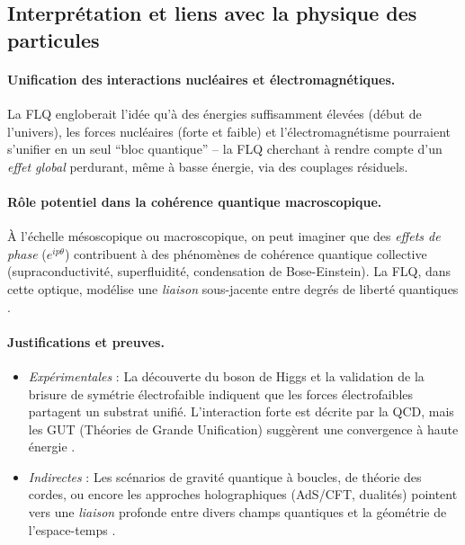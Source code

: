 \documentclass[12pt]{article}
\begin{document}
\subsection{Interprétation et liens avec la physique des particules}

\paragraph{Unification des interactions nucléaires et électromagnétiques.}
La FLQ engloberait l'idée qu'à des énergies suffisamment élevées (début de l'univers), 
les forces nucléaires (forte et faible) et l'électromagnétisme 
pourraient s'unifier \cite{georgi1974unified, langacker1981grand} 
en un seul ``bloc quantique'' – la FLQ cherchant à rendre compte d'un \emph{effet global} 
perdurant, même à basse énergie, via des couplages résiduels.

\paragraph{Rôle potentiel dans la cohérence quantique macroscopique.}
À l'échelle mésoscopique ou macroscopique, on peut imaginer que des \emph{effets de phase} 
($e^{i p \theta}$) contribuent à des phénomènes de cohérence quantique collective 
(supraconductivité, superfluidité, condensation de Bose-Einstein). 
La FLQ, dans cette optique, modélise une \emph{liaison} sous-jacente 
entre degrés de liberté quantiques \cite{rovelli2004quantum, polchinski1998string}.

\paragraph{Justifications et preuves.}
\begin{itemize}
    \item \emph{Expérimentales} : La découverte du boson de Higgs et la validation 
          de la brisure de symétrie électrofaible indiquent que les forces électrofaibles 
          partagent un substrat unifié. L'interaction forte est décrite par la QCD, 
          mais les GUT (Théories de Grande Unification) suggèrent une convergence 
          à haute énergie \cite{amaldi1991precision}.
    \item \emph{Indirectes} : Les scénarios de gravité quantique à boucles, 
          de théorie des cordes, ou encore les approches holographiques 
          (AdS/CFT, dualités) pointent vers une \emph{liaison} profonde 
          entre divers champs quantiques et la géométrie de l'espace-temps 
          \cite{maldacena1999large, vanraamsdonk2010building}.
\end{itemize}
\end{document}
